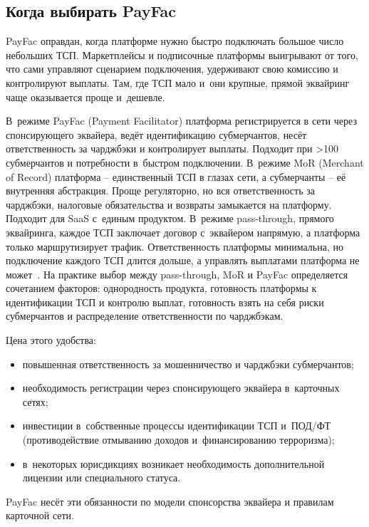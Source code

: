 \subsection*{Когда выбирать PayFac}

PayFac оправдан, когда платформе нужно быстро подключать большое
число небольших ТСП. Маркетплейсы и подписочные платформы выигрывают
от того, что сами управляют сценарием подключения, удерживают свою
комиссию и контролируют выплаты. Там, где ТСП мало и~они крупные,
прямой эквайринг чаще оказывается проще и~дешевле.

В~режиме PayFac (Payment Facilitator) платформа регистрируется в
сети через спонсирующего эквайера, ведёт идентификацию субмерчантов, несёт
ответственность за чарджбэки и контролирует выплаты. Подходит при
>100 субмерчантов и потребности в~быстром подключении.
В~режиме MoR (Merchant of Record) платформа -- единственный ТСП в
глазах сети, а субмерчанты -- её внутренняя абстракция. Проще
регуляторно, но вся ответственность за чарджбэки, налоговые
обязательства и возвраты замыкается на платформу. Подходит для SaaS
с~единым продуктом. В~режиме pass-through, прямого эквайринга, каждое
ТСП заключает договор с~эквайером напрямую, а платформа только
маршрутизирует трафик. Ответственность платформы минимальна, но
подключение каждого ТСП длится дольше, а управлять выплатами
платформа не
может~\cite{visa-acceptance-entities}. На практике выбор между
pass-through, MoR и PayFac определяется сочетанием факторов:
однородность продукта, готовность платформы к идентификации ТСП и контролю
выплат, готовность взять на себя риски субмерчантов и распределение
ответственности по чарджбэкам.

Цена этого удобства:
\begin{itemize}
  \item повышенная ответственность за мошенничество и чарджбэки
    субмерчантов;
  \item необходимость регистрации через спонсирующего эквайера
    в~карточных сетях;
  \item инвестиции в~собственные процессы идентификации ТСП и~ПОД/ФТ
    (противодействие отмыванию доходов и~финансированию терроризма);
  \item в~некоторых юрисдикциях возникает необходимость дополнительной
    лицензии или специального статуса.
\end{itemize}

PayFac несёт эти обязанности по модели спонсорства эквайера
и правилам карточной
сети.~\cite{visa-acceptance-entities,visa-payment-facilitator-marketplace-risk-guide}

